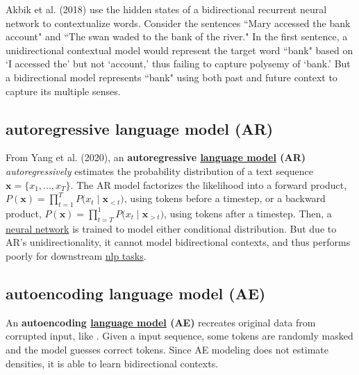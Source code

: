 
Akbik et al. (2018) use the hidden states of a bidirectional recurrent neural network to contextualize words. Consider the sentences ``Mary accessed the bank account" and ``The swan waded to the bank of the river." In the first sentence, a unidirectional contextual model would represent the target word ``bank" based on `I accessed the' but not `account,' thus failing to capture polysemy of `bank.' But a bidirectional model represents ``bank" using both past and future context to capture its multiple senses. 




\subsection{autoregressive language model (AR)}\label{sec:autoregressiveLM}

From Yang et al. (2020), an \textbf{autoregressive \hyperref[sec:LanguageModels]{language model} (AR)} \emph{autoregressively} estimates the probability distribution of a text sequence $\textbf{x} = \Big\{ x_1,...,x_T \Big\}$. The AR model factorizes the likelihood into a forward product, $P(\textbf{x}) = \prod_{t=1}^T P \Big(x_t \; | \; \textbf{x}_{< t} \Big)$, using tokens before a timestep, or a backward product, $P(\textbf{x}) = \prod_{t=T}^1 P \Big(x_t \; | \; \textbf{x}_{> t} \Big)$, using tokens after a timestep. Then, a \hyperref[sec:NeuralLM]{neural network} is trained to model either conditional distribution. But due to AR's unidirectionality, it cannot model bidirectional contexts, and thus performs poorly for downstream \hyperref[app:Appendix_NLPTasks]{nlp tasks}. 

\subsection{autoencoding language model (AE)}\label{sec:autoencodingLM}

An \textbf{autoencoding \hyperref[sec:LanguageModels]{language model} (AE)} recreates original data from corrupted input, like . Given a input sequence, some tokens are randomly masked and the model guesses correct tokens. Since AE modeling does not estimate densities, it is able to learn bidirectional contexts. 
